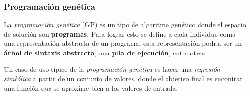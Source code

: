 \subsubsection{Programación genética}
  La \textit{programación genética} (GP)\autocite{langdonFoundationsGeneticProgramming2013} es un tipo de algoritmo 
  genético donde el espacio de solución son \textbf{programas}.
  Para lograr esto se define a cada individuo como una representación abstracta de un programa, esta
  representación podría ser un \textbf{árbol de sintaxis abstracta}, una \textbf{pila de ejecución},
  entre otras.

  Un caso de uso típico de la \textit{programación genética} es hacer una \textit{regresión 
  simbólica}\autocite{poliFieldGuideGenetic2008} a partir de un conjunto de valores, donde el objetivo final es 
  encontrar una función que se aproxime bien a los valores de entrada.